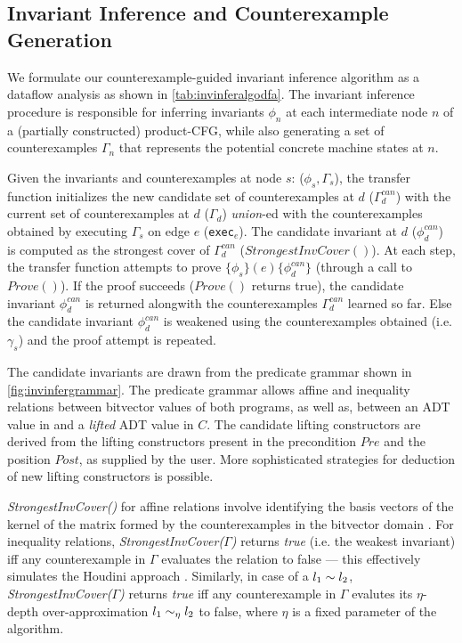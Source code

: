 


\subsection{Invariant Inference and Counterexample Generation}
\label{sec:invinferalgo}
We formulate our counterexample-guided invariant inference algorithm as a dataflow analysis
as shown in \cref{tab:invinferalgodfa}.
The invariant inference procedure is responsible for inferring invariants $\phi_n$ at each intermediate
node $n$ of a (partially constructed) product-CFG, while also generating a set of counterexamples
$\Gamma_n$ that represents the potential concrete machine states at $n$.

Given the invariants and counterexamples at node $s$: ($\phi_s,\Gamma_s$),
the transfer function initializes the new candidate set of counterexamples at $d$ ($\Gamma^{can}_{d}$)
with the current set of counterexamples at $d$ ($\Gamma_{d}$) {\em union}-ed with
the counterexamples obtained by executing $\Gamma_s$ on edge $e$ ({\tt exec}$_e$).
The candidate invariant at $d$ ($\phi^{can}_d$) is computed as the strongest cover
of $\Gamma^{can}_{d}$ ($StrongestInvCover()$).
At each step, the transfer function attempts to prove $\{\phi_s\} (e) \{\phi^{can}_d\}$
(through a call to $Prove()$).
If the proof succeeds ($Prove()$ returns true), the candidate invariant $\phi^{can}_d$ is returned alongwith
the counterexamples $\Gamma^{can}_d$ learned so far.
Else the candidate invariant $\phi^{can}_d$ is weakened using the counterexamples obtained
(i.e. $\gamma_s$) and the proof attempt is repeated.

The candidate invariants are drawn from the predicate grammar shown in \cref{fig:invinfergrammar}.
The predicate grammar allows affine and inequality relations between bitvector values of both
programs, as well as, \recursiveRelations{} between an ADT value in \SpecL{} and a {\em lifted} ADT value in $C$.
The candidate lifting constructors are derived from the lifting constructors
present in the precondition $Pre$ and the position $Post$, as supplied by the user.
More sophisticated strategies for deduction of new lifting constructors is possible.

{\em StrongestInvCover()} for affine relations involve
identifying the basis vectors of the kernel of the
matrix formed by the counterexamples in the bitvector
domain \cite{esop05,semalign}.
For inequality relations, {\em StrongestInvCover($\Gamma$)}
returns {\em true} (i.e. the weakest invariant) iff any counterexample in $\Gamma$ evaluates the
relation to false --- this effectively simulates the Houdini approach \cite{houdini}.
Similarly, in case of a \recursiveRelation{} $l_1 \sim{} l_2$, {\em StrongestInvCover($\Gamma$)}
returns {\em true} iff any counterexample in $\Gamma$ evalutes its $\eta$-depth over-approximation
$l_1 \sim_\eta l_2$ to false, where $\eta$ is a fixed parameter of the algorithm.


